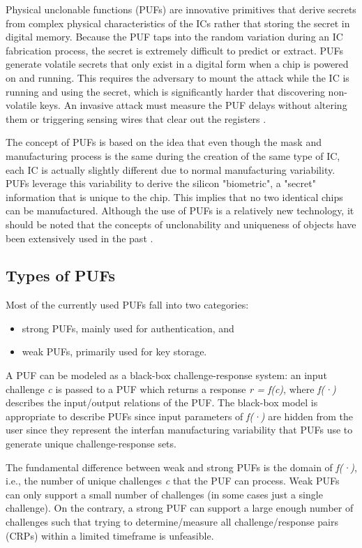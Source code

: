 Physical unclonable functions (PUFs) are innovative primitives that derive secrets from complex physical characteristics of the ICs rather that storing the secret in digital memory. Because the PUF taps into the random variation during an IC fabrication process, the secret is extremely difficult to predict or extract. PUFs generate volatile secrets that only exist in a digital form when a chip is powered on and running. This requires the adversary to mount the attack while the IC is running and using the secret, which is significantly harder that discovering non-volatile keys. An invasive attack must measure the PUF delays without altering them or triggering sensing wires that clear out the registers \cite{PUF_Suh_Devadas}.

The concept of PUFs is based on the idea that even though the mask and manufacturing process is the same during the creation of the same type of IC, each IC is actually slightly different due to normal manufacturing variability. PUFs leverage this variability to derive the silicon "biometric", a "secret" information that is unique to the chip. This implies that no two identical chips can be manufactured.  
Although the use of PUFs is a relatively new technology, it should be noted that the concepts of unclonability and uniqueness of objects have been extensively used in the past \cite{PUF_IEEE_Herder}.

\subsection{Types of PUFs}
Most of the currently used PUFs fall into two categories: 
\begin{itemize}
\item strong PUFs, mainly used for authentication, and 
\item weak PUFs, primarily used for key storage.
\end{itemize}

A PUF can be modeled as a black-box challenge-response system: an input challenge \emph{c} is passed to a PUF which returns a response \emph{r = f(c)}, where \emph{f(·)} describes the input/output relations of the PUF. The black-box model is appropriate to describe PUFs since input parameters of \emph{f(·)} are hidden from the user since they represent the interfan manufacturing variability that PUFs use to generate unique challenge-response sets.

The fundamental difference between weak and strong PUFs is the domain of \emph{f(·)}, i.e., the number of unique challenges \emph{c} that the PUF can process. Weak PUFs can only support a small number of challenges (in some cases just a single challenge). On the contrary, a strong PUF can support a large enough number of challenges such that trying to determine/measure all challenge/response pairs (CRPs) within a limited timeframe is unfeasible.

